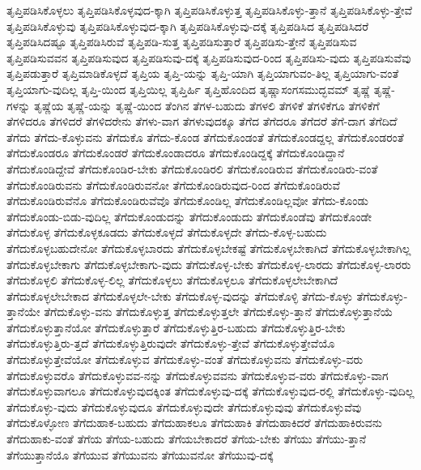 {ತೃಪ್ತಿಪಡಿಸಿಕೊಳ್ಳಲು
ತೃಪ್ತಿಪಡಿಸಿಕೊಳ್ಳವುದ-ಕ್ಕಾಗಿ
ತೃಪ್ತಿಪಡಿಸಿಕೊಳ್ಳುತ್ತ
ತೃಪ್ತಿಪಡಿಸಿಕೊಳ್ಳು-ತ್ತಾನೆ
ತೃಪ್ತಿಪಡಿಸಿಕೊಳ್ಳು-ತ್ತೇವೆ
ತೃಪ್ತಿಪಡಿಸಿಕೊಳ್ಳುವು
ತೃಪ್ತಿಪಡಿಸಿಕೊಳ್ಳುವುದ-ಕ್ಕಾಗಿ
ತೃಪ್ತಿಪಡಿಸಿಕೊಳ್ಳುವು-ದಕ್ಕೆ
ತೃಪ್ತಿಪಡಿಸಿದ
ತೃಪ್ತಿಪಡಿಸಿದರೆ
ತೃಪ್ತಿಪಡಿಸಿದಷ್ಟೂ
ತೃಪ್ತಿಪಡಿಸಿರುವೆ
ತೃಪ್ತಿಪಡಿ-ಸುತ್ತ
ತೃಪ್ತಿಪಡಿಸುತ್ತಾರೆ
ತೃಪ್ತಿಪಡಿಸು-ತ್ತೇನೆ
ತೃಪ್ತಿಪಡಿಸುವ
ತೃಪ್ತಿಪಡಿಸುವವನ
ತೃಪ್ತಿಪಡಿಸುವುದ
ತೃಪ್ತಿಪಡಿಸುವು-ದಕ್ಕೆ
ತೃಪ್ತಿಪಡಿಸುವುದ-ರಿಂದ
ತೃಪ್ತಿಪಡಿಸು-ವುದು
ತೃಪ್ತಿಪಡಿಸುವೆವು
ತೃಪ್ತಿಪಡುತ್ತಾರೆ
ತೃಪ್ತಿಮಾಡಿಕೊಳ್ಳದೆ
ತೃಪ್ತಿಯ
ತೃಪ್ತಿ-ಯನ್ನು
ತೃಪ್ತಿ-ಯಾಗಿ
ತೃಪ್ತಿಯಾಗುವಂ-ತಿಲ್ಲ
ತೃಪ್ತಿಯಾಗು-ವಂತೆ
ತೃಪ್ತಿಯಾಗು-ವುದಿಲ್ಲ
ತೃಪ್ತಿ-ಯಿಂದ
ತೃಪ್ತಿಯಿಲ್ಲ
ತೃಪ್ತಿರ್ಹಿ
ತೃಪ್ತಿಹೊಂದಿದ
ತೃಷ್ಣಾಸಂಗಸಮುದ್ಭವಮ್
ತೃಷ್ಣೆ
ತೃಷ್ಣೆ-ಗಳನ್ನು
ತೃಷ್ಣೆಯ
ತೃಷ್ಣೆ-ಯನ್ನು
ತೃಷ್ಣೆ-ಯಿಂದ
ತೆಂಗಿನ
ತೆಗಳ-ಬಹುದು
ತೆಗಳಲಿ
ತೆಗಳಿಕೆ
ತೆಗಳಿಕೆಗೂ
ತೆಗಳಿಕೆಗೆ
ತೆಗಳಿದರೂ
ತೆಗಳಿದರೆ
ತೆಗಳಿದರೇನು
ತೆಗಳು-ವಾಗ
ತೆಗಳುವುದಕ್ಕೂ
ತೆಗೆದ
ತೆಗೆದರೂ
ತೆಗೆದರೆ
ತೆಗೆ-ದಾಗ
ತೆಗೆದಿದೆ
ತೆಗೆದು
ತೆಗೆದು-ಕೊಳ್ಳುವನು
ತೆಗೆದುಕೊ
ತೆಗೆದು-ಕೊಂಡ
ತೆಗೆದುಕೊಂಡಂತೆ
ತೆಗೆದುಕೊಂಡದ್ದಲ್ಲ
ತೆಗೆದುಕೊಂಡರಂತೆ
ತೆಗೆದುಕೊಂಡರೂ
ತೆಗೆದುಕೊಂಡರೆ
ತೆಗೆದುಕೊಂಡಾದರೂ
ತೆಗೆದುಕೊಂಡಿದ್ದಕ್ಕೆ
ತೆಗೆದುಕೊಂಡಿದ್ದಾನೆ
ತೆಗೆದುಕೊಂಡಿದ್ದೇವೆ
ತೆಗೆದುಕೊಂಡಿರ-ಬೇಕು
ತೆಗೆದುಕೊಂಡಿರಲಿ
ತೆಗೆದುಕೊಂಡಿರುವ
ತೆಗೆದುಕೊಂಡಿರು-ವಂತೆ
ತೆಗೆದುಕೊಂಡಿರುವನು
ತೆಗೆದುಕೊಂಡಿರುವನೋ
ತೆಗೆದುಕೊಂಡಿರುವುದ-ರಿಂದ
ತೆಗೆದುಕೊಂಡಿರುವೆ
ತೆಗೆದುಕೊಂಡಿರುವೆನೊ
ತೆಗೆದುಕೊಂಡಿರುವೆವೊ
ತೆಗೆದುಕೊಂಡಿಲ್ಲ
ತೆಗೆದುಕೊಂಡಿಲ್ಲವೋ
ತೆಗೆದು-ಕೊಂಡು
ತೆಗೆದುಕೊಂಡು-ಬಿಡು-ವುದಿಲ್ಲ
ತೆಗೆದುಕೊಂಡುದನ್ನು
ತೆಗೆದುಕೊಂಡುದು
ತೆಗೆದುಕೊಂಡೆವು
ತೆಗೆದುಕೊಂಡೇ
ತೆಗೆದುಕೊಳ್ಳ
ತೆಗೆದುಕೊಳ್ಳಕೂಡದು
ತೆಗೆದುಕೊಳ್ಳದೆ
ತೆಗೆದುಕೊಳ್ಳದೇ
ತೆಗೆದು-ಕೊಳ್ಳ-ಬಹುದು
ತೆಗೆದುಕೊಳ್ಳಬಹುದೇನೋ
ತೆಗೆದುಕೊಳ್ಳಬಾರದು
ತೆಗೆದುಕೊಳ್ಳಬೇಕಷ್ಟೆ
ತೆಗೆದುಕೊಳ್ಳಬೇಕಾಗಿದೆ
ತೆಗೆದುಕೊಳ್ಳಬೇಕಾಗಿಲ್ಲ
ತೆಗೆದುಕೊಳ್ಳಬೇಕಾಗು
ತೆಗೆದುಕೊಳ್ಳಬೇಕಾಗು-ವುದು
ತೆಗೆದುಕೊಳ್ಳ-ಬೇಕು
ತೆಗೆದುಕೊಳ್ಳ-ಲಾರದು
ತೆಗೆದುಕೊಳ್ಳ-ಲಾರರು
ತೆಗೆದುಕೊಳ್ಳಲಿ
ತೆಗೆದುಕೊಳ್ಳ-ಲಿಲ್ಲ
ತೆಗೆದುಕೊಳ್ಳಲು
ತೆಗೆದುಕೊಳ್ಳಲೂ
ತೆಗೆದುಕೊಳ್ಳಲೇಬೇಕಾಗಿದೆ
ತೆಗೆದುಕೊಳ್ಳಲೇಬೇಕಾದ
ತೆಗೆದುಕೊಳ್ಳಲೇ-ಬೇಕು
ತೆಗೆದುಕೊಳ್ಳ-ವುದನ್ನು
ತೆಗೆದುಕೊಳ್ಳಿ
ತೆಗೆದು-ಕೊಳ್ಳು
ತೆಗೆದುಕೊಳ್ಳು-ತ್ತಾನೆಯೇ
ತೆಗೆದುಕೊಳ್ಳು-ವನು
ತೆಗೆದುಕೊಳ್ಳುತ್ತ
ತೆಗೆದುಕೊಳ್ಳುತ್ತಲೇ
ತೆಗೆದುಕೊಳ್ಳು-ತ್ತಾನೆ
ತೆಗೆದುಕೊಳ್ಳುತ್ತಾನೆಯೆ
ತೆಗೆದುಕೊಳ್ಳುತ್ತಾನೆಯೋ
ತೆಗೆದುಕೊಳ್ಳುತ್ತಾರೆ
ತೆಗೆದುಕೊಳ್ಳುತ್ತಿರ-ಬಹುದು
ತೆಗೆದುಕೊಳ್ಳುತ್ತಿರ-ಬೇಕು
ತೆಗೆದುಕೊಳ್ಳುತ್ತಿರು-ತ್ತದೆ
ತೆಗೆದುಕೊಳ್ಳುತ್ತಿರುವುದೇ
ತೆಗೆದುಕೊಳ್ಳು-ತ್ತೇವೆ
ತೆಗೆದುಕೊಳ್ಳುತ್ತೇವೆಯೊ
ತೆಗೆದುಕೊಳ್ಳುತ್ತೇವೆಯೋ
ತೆಗೆದುಕೊಳ್ಳುವ
ತೆಗೆದುಕೊಳ್ಳು-ವಂತೆ
ತೆಗೆದುಕೊಳ್ಳುವನು
ತೆಗೆದುಕೊಳ್ಳು-ವರು
ತೆಗೆದುಕೊಳ್ಳುವರೊ
ತೆಗೆದುಕೊಳ್ಳುವವ-ನನ್ನು
ತೆಗೆದುಕೊಳ್ಳುವವನು
ತೆಗೆದುಕೊಳ್ಳುವ-ವರು
ತೆಗೆದುಕೊಳ್ಳು-ವಾಗ
ತೆಗೆದುಕೊಳ್ಳುವಾಗಲೂ
ತೆಗೆದುಕೊಳ್ಳುವುದಕ್ಕಿಂತ
ತೆಗೆದುಕೊಳ್ಳುವು-ದಕ್ಕೆ
ತೆಗೆದುಕೊಳ್ಳುವುದ-ರಲ್ಲಿ
ತೆಗೆದುಕೊಳ್ಳು-ವುದಿಲ್ಲ
ತೆಗೆದುಕೊಳ್ಳು-ವುದು
ತೆಗೆದುಕೊಳ್ಳುವುದೂ
ತೆಗೆದುಕೊಳ್ಳುವುದೇ
ತೆಗೆದುಕೊಳ್ಳುವುವು
ತೆಗೆದುಕೊಳ್ಳುವೆವು
ತೆಗೆದುಕೊಳ್ಳೋಣ
ತೆಗೆದುಹಾಕ-ಬಹುದು
ತೆಗೆದುಹಾಕಲೂ
ತೆಗೆದುಹಾಕಿ
ತೆಗೆದುಹಾಕಿದರೆ
ತೆಗೆದುಹಾಕಿರುವನು
ತೆಗೆದುಹಾಕು-ವಂತೆ
ತೆಗೆಯ
ತೆಗೆಯ-ಬಹುದು
ತೆಗೆಯಬೇಕಾದರೆ
ತೆಗೆಯ-ಬೇಕು
ತೆಗೆಯು
ತೆಗೆಯು-ತ್ತಾನೆ
ತೆಗೆಯುತ್ತಾನೆಯೊ
ತೆಗೆಯುವ
ತೆಗೆಯುವನು
ತೆಗೆಯುವನೋ
ತೆಗೆಯುವು-ದಕ್ಕೆ
}

